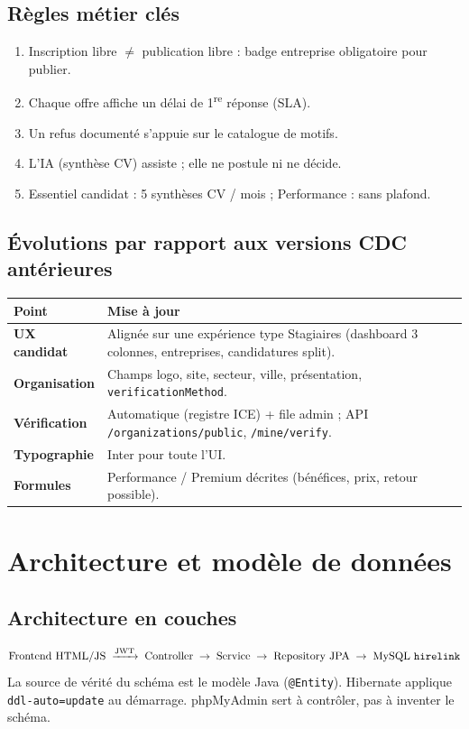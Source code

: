 \documentclass[11pt,a4paper,oneside]{report}
\begin{document}
\section{Règles métier clés}
\begin{reqbox}
\begin{enumerate}[leftmargin=1.4em]
  \item Inscription libre $\neq$ publication libre : badge entreprise obligatoire pour publier.
  \item Chaque offre affiche un délai de 1\textsuperscript{re} réponse (SLA).
  \item Un refus documenté s'appuie sur le catalogue de motifs.
  \item L'IA (synthèse CV) assiste ; elle ne postule ni ne décide.
  \item Essentiel candidat : 5 synthèses CV / mois ; Performance : sans plafond.
\end{enumerate}
\end{reqbox}

\section{Évolutions par rapport aux versions CDC antérieures}
\begin{tabularx}{\textwidth}{@{}>{\bfseries}p{3.2cm}X@{}}
\toprule
Point & Mise à jour \\
\midrule
UX candidat & Alignée sur une expérience type Stagiaires (dashboard 3 colonnes, entreprises, candidatures split). \\
Organisation & Champs logo, site, secteur, ville, présentation, \texttt{verificationMethod}. \\
Vérification & Automatique (registre ICE) + file admin ; API \texttt{/organizations/public}, \texttt{/mine/verify}. \\
Typographie & Inter pour toute l'UI. \\
Formules & Performance / Premium décrites (bénéfices, prix, retour possible). \\
\bottomrule
\end{tabularx}

\chapter{Architecture et modèle de données}

\section{Architecture en couches}
\[
\text{Frontend HTML/JS} \;\xrightarrow{\text{JWT}}\; \text{Controller} \;\rightarrow\; \text{Service} \;\rightarrow\; \text{Repository JPA} \;\rightarrow\; \text{MySQL \texttt{hirelink}}
\]
La source de vérité du schéma est le modèle Java (\texttt{@Entity}). Hibernate applique \texttt{ddl-auto=update} au démarrage. phpMyAdmin sert à contrôler, pas à inventer le schéma.
\end{document}
